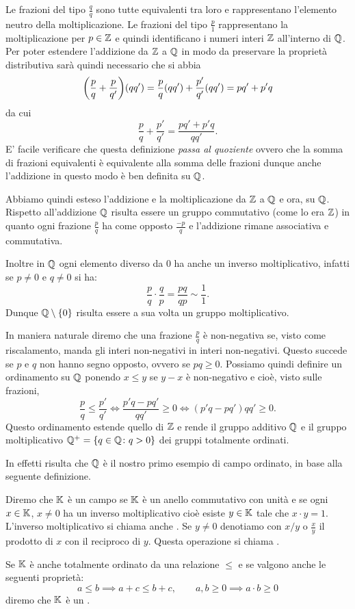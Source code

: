 Le frazioni del tipo $\frac{q}{q}$ sono tutte equivalenti tra loro e rappresentano 
l'elemento neutro della moltiplicazione.
Le frazioni del tipo $\frac{p}{1}$ rappresentano la moltiplicazione per $p\in{\mathbb Z}$ 
e quindi identificano i numeri interi ${\mathbb Z}$ all'interno di ${\mathbb Q}$.
Per poter estendere l'addizione da ${\mathbb Z}$ a ${\mathbb Q}$ in modo da preservare 
la proprietà distributiva sarà quindi necessario che 
si abbia 
\[
  {\left( \frac{p}{q}+\frac{p}{q'} \right)} (qq') = \frac{p}{q}(qq') + \frac{p'}{q'}(qq')
  = pq' + p'q
\]
da cui
\[
  \frac{p}{q} + \frac{p'}{q'} = \frac{pq'+p'q}{qq'}.  
\]
E' facile verificare che questa definizione \emph{passa al quoziente}
ovvero che la somma di frazioni equivalenti è equivalente alla somma delle 
frazioni dunque anche l'addizione in questo modo è ben definita su ${\mathbb Q}$.

Abbiamo quindi esteso l'addizione e la moltiplicazione da ${\mathbb Z}$ a ${\mathbb Q}$
e ora, su ${\mathbb Q}$.
Rispetto all'addizione ${\mathbb Q}$ risulta essere un gruppo commutativo (come lo era ${\mathbb Z}$)
in quanto ogni frazione $\frac{p}{q}$ ha come opposto $\frac{-p}{q}$ 
e l'addizione rimane associativa e commutativa.

Inoltre in ${\mathbb Q}$ ogni elemento diverso da $0$
ha anche un inverso moltiplicativo, infatti se $p\neq 0$ e $q\neq 0$ si ha:
\[
 \frac{p}{q}\cdot \frac{q}{p} = \frac{pq}{qp} \sim \frac{1}{1}.  
\]
Dunque ${\mathbb Q}\setminus{\left\{ 0 \right\}}$ risulta essere a sua volta un gruppo 
moltiplicativo.

In maniera naturale diremo che una frazione $\frac{p}{q}$ è non-negativa 
se, visto come riscalamento, manda gli interi non-negativi in interi non-negativi. 
Questo succede se $p$ e $q$ non hanno segno opposto, ovvero se $pq\ge 0$.
Possiamo quindi definire un ordinamento su ${\mathbb Q}$ 
ponendo $x\le y$ se $y-x$ è non-negativo e cioè, visto sulle frazioni,
\[
 \frac{p}{q} \le \frac{p'}{q'} \iff \frac{p'q-pq'}{qq'}\ge 0 
 \iff (p'q-pq')qq' \ge 0. 
\]
Questo ordinamento estende quello di ${\mathbb Z}$ e rende il gruppo additivo ${\mathbb Q}$
e il gruppo moltiplicativo ${\mathbb Q}^+ = {\left\{ q\in {\mathbb Q}\colon q>0 \right\}}$
dei gruppi totalmente ordinati.

In effetti risulta che ${\mathbb Q}$ è il nostro primo esempio 
di campo ordinato, in base alla seguente definizione.

\begin{definition}[campo]
  \label{def:campo}%
  Diremo che ${\mathbb K}$ è un campo se ${\mathbb K}$ è un anello commutativo con unità 
  e se ogni $x\in {\mathbb K}$, $x\neq 0$ ha un inverso moltiplicativo cioè 
  esiste $y\in {\mathbb K}$ tale che $x\cdot y = 1$.
  L'inverso moltiplicativo si chiama anche .
  Se $y\neq 0$ denotiamo con $x/y$ o $\frac x y$ il prodotto 
  di $x$ con il reciproco di $y$. 
  Questa operazione si chiama .

  Se ${\mathbb K}$ è anche totalmente ordinato da una relazione $\le$
  e se valgono anche le seguenti proprietà:
  \[
  a \le b \implies a+c\le b+c, \qquad 
  a,b\ge 0 \implies a\cdot b \ge 0
  \]
  diremo che ${\mathbb K}$ è un .
\end{definition}

